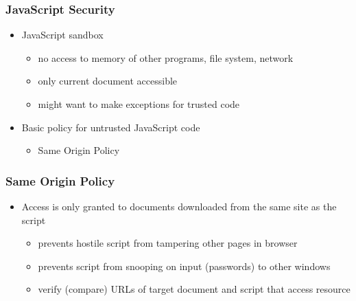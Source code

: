 \documentclass{beamer}
\begin{document}
\begin{frame}\frametitle{JavaScript Security}
\begin{itemize}\itemsep=1.5ex
\item JavaScript sandbox
  \begin{itemize}
  \item no access to memory of other programs, file system, network
  \item only current document accessible
  \item might want to make exceptions
    for trusted code
  \end{itemize}
\item Basic policy for untrusted JavaScript code
  \begin{itemize}
  \item Same Origin Policy
  \end{itemize}
\end{itemize}
\end{frame}

\begin{frame}
  \frametitle{Same Origin Policy}

  \begin{itemize}
  \item Access is only granted to documents downloaded from the
    same site as the script
    \begin{itemize}
    \item prevents hostile script from tampering other pages in browser
    \item prevents script from snooping on input (passwords) to other
      windows
    \item verify (compare) URLs of target document and script that access
      resource
    \end{itemize}
  \end{itemize}
\end{frame}
\end{document}
